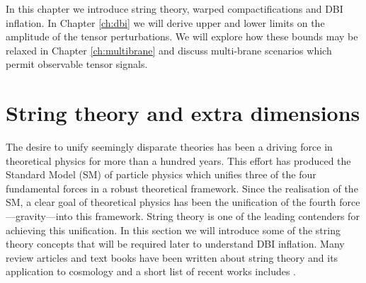 In this chapter we introduce string theory, warped compactifications and DBI inflation.
In Chapter \ref{ch:dbi} we will derive upper and lower 
limits on the amplitude of the tensor perturbations.  
We will explore how these bounds may be relaxed in Chapter \ref{ch:multibrane} and discuss
multi-brane 
scenarios which permit observable tensor signals. 

\section{String theory and extra dimensions}
\label{sec:extradims}
The desire to unify seemingly disparate theories has been a driving force in
theoretical physics for more than a hundred years. This effort has produced 
the Standard Model (SM) of particle physics which unifies three of the four
fundamental forces in a robust theoretical framework. Since the realisation of
the SM, a clear goal of theoretical physics has been the unification of the
fourth force---gravity---into this framework. String theory is one of the leading
contenders for achieving this unification. 
In this section we will introduce
some of the string theory concepts that will be required later to understand DBI
inflation.
Many review articles and text books have been written about string theory and
its application to cosmology and a short list of recent works includes
\cite{cline, Johnson2000, Baumann:2009ni,Kallosh:2007wm,
Linde:2005dd,McAllister:2007bg}.


